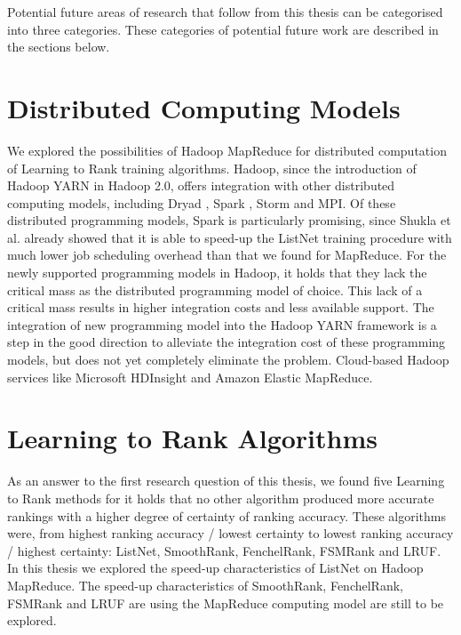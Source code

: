 Potential future areas of research that follow from this thesis can be categorised into three categories. These categories of potential future work are described in the sections below.

\section{Distributed Computing Models}
We explored the possibilities of Hadoop MapReduce for distributed computation of Learning to Rank training algorithms. Hadoop, since the introduction of Hadoop YARN in Hadoop 2.0, offers integration with other distributed computing models, including Dryad \cite{Isard2007}, Spark \cite{Zaharia2010}, Storm \cite{Aniello2013} and \ac{MPI}. Of these distributed programming models, Spark is particularly promising, since Shukla et al. \cite{Shukla2012} already showed that it is able to speed-up the ListNet training procedure with much lower job scheduling overhead than that we found for MapReduce. For the newly supported programming models in Hadoop, it holds that they lack the critical mass as the distributed programming model of choice. This lack of a critical mass results in higher integration costs and less available support. The integration of new programming model into the Hadoop YARN framework is a step in the good direction to alleviate the integration cost of these programming models, but does not yet completely eliminate the problem. Cloud-based Hadoop services like Microsoft HDInsight and Amazon Elastic MapReduce.

\section{Learning to Rank Algorithms}
As an answer to the first research question of this thesis, we found five Learning to Rank methods for it holds that no other algorithm produced more accurate rankings with a higher degree of certainty of ranking accuracy. These algorithms were, from highest ranking accuracy / lowest certainty to lowest ranking accuracy / highest certainty: ListNet, SmoothRank, FenchelRank, FSMRank and LRUF. In this thesis we explored the speed-up characteristics of ListNet on Hadoop MapReduce. The speed-up characteristics of SmoothRank, FenchelRank, FSMRank and LRUF are using the MapReduce computing model are still to be explored.

